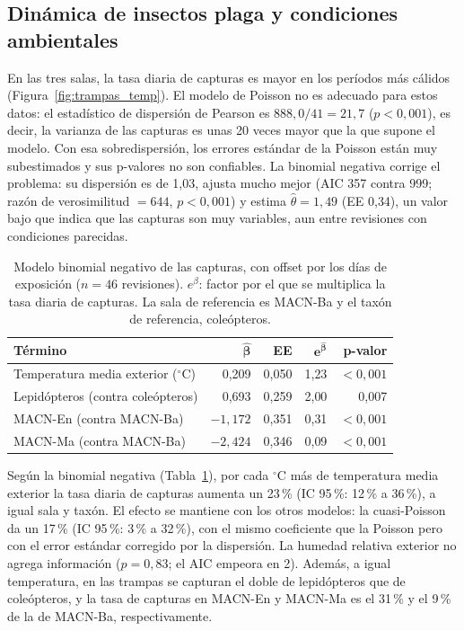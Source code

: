 \documentclass[11pt,a4paper]{article}
\begin{document}
\subsection{Dinámica de insectos plaga y condiciones ambientales}
\label{sec:resultados_trampas}
En las tres salas, la tasa diaria de capturas es mayor en los períodos más cálidos (Figura~\ref{fig:trampas_temp}). El modelo de Poisson no es adecuado para estos datos: el estadístico de dispersión de Pearson es $888{,}0/41 = 21{,}7$ ($p < 0{,}001$), es decir, la varianza de las capturas es unas 20 veces mayor que la que supone el modelo. Con esa sobredispersión, los errores estándar de la Poisson están muy subestimados y sus p-valores no son confiables. La binomial negativa corrige el problema: su dispersión es de 1{,}03, ajusta mucho mejor (AIC 357 contra 999; razón de verosimilitud $= 644$, $p < 0{,}001$) y estima $\hat\theta = 1{,}49$ (EE 0{,}34), un valor bajo que indica que las capturas son muy variables, aun entre revisiones con condiciones parecidas.

\begin{table}[htbp]
\centering
\small
\caption{Modelo binomial negativo de las capturas, con offset por los días de exposición ($n = 46$ revisiones). $e^{\beta}$: factor por el que se multiplica la tasa diaria de capturas. La sala de referencia es MACN-Ba y el taxón de referencia, coleópteros.}
\label{tab:trampas}
\begin{tabular}{l r r r r}
\toprule
\textbf{Término} & $\boldsymbol{\hat\beta}$ & \textbf{EE} & $\boldsymbol{e^{\hat\beta}}$ & \textbf{p-valor} \\
\midrule
Temperatura media exterior ($^\circ$C) & 0{,}209 & 0{,}050 & 1{,}23 & $< 0{,}001$ \\
Lepidópteros (contra coleópteros)      & 0{,}693 & 0{,}259 & 2{,}00 & 0{,}007 \\
MACN-En (contra MACN-Ba)               & $-1{,}172$ & 0{,}351 & 0{,}31 & $< 0{,}001$ \\
MACN-Ma (contra MACN-Ba)               & $-2{,}424$ & 0{,}346 & 0{,}09 & $< 0{,}001$ \\
\bottomrule
\end{tabular}
\end{table}

Según la binomial negativa (Tabla~\ref{tab:trampas}), por cada $^\circ$C más de temperatura media exterior la tasa diaria de capturas aumenta un 23\,\% (IC 95\,\%: 12\,\% a 36\,\%), a igual sala y taxón. El efecto se mantiene con los otros modelos: la cuasi-Poisson da un 17\,\% (IC 95\,\%: 3\,\% a 32\,\%), con el mismo coeficiente que la Poisson pero con el error estándar corregido por la dispersión. La humedad relativa exterior no agrega información ($p = 0{,}83$; el AIC empeora en 2). Además, a igual temperatura, en las trampas se capturan el doble de lepidópteros que de coleópteros, y la tasa de capturas en MACN-En y MACN-Ma es el 31\,\% y el 9\,\% de la de MACN-Ba, respectivamente.
\end{document}
